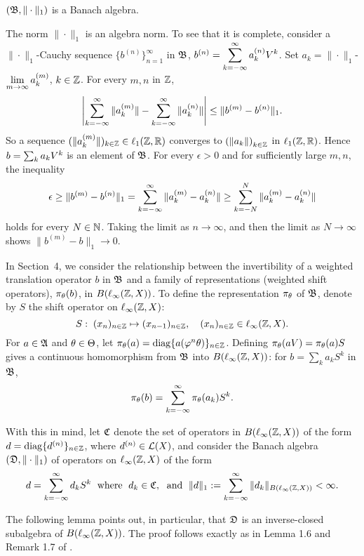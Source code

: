 \begin{prop}
$({\frak{B}},\|\cdot\|_1)$ is a Banach algebra.
\end{prop}
\begin{pf}
The norm $\|\cdot\|_1$ is an algebra norm.
To see that it is
complete, consider a $\|\cdot\|_1$-Cauchy sequence
$\{b^{(n)}\}_{n=1}^\infty$ in ${\frak{B}}$, $b^{(n)} =
\displaystyle\sum_{k=-\infty}^\infty a^{(n)}_k V^k$.  Set $a_k =
\|\cdot\|_1$-$\displaystyle\lim\sb{m\to \infty} a^{(m)}_k$,
$k\in{\Bbb{Z}}$.  For every $m,n$ in ${\Bbb{Z}}$,
$$
\left|\sum_{k=-\infty}^\infty\|a_k^{(m)}\|-\sum_{k=-\infty}^\infty\|a^{(n)}_k\|\right| \le
\|b^{(m)}-b^{(n)}\|_1.
$$
So a sequence $(\|a^{(m)}_k\|)_{k\in{\Bbb{Z}}} \in \ell_1({\Bbb{Z}},{\Bbb{R}})$
converges to $\left(\|a_k\|\right)_{k\in{\Bbb{Z}}}$ in $\ell_1({\Bbb{Z}},{\Bbb{R}})$.
Hence $b=\sum\sb{k} a_kV^k$ is an element of ${\frak{B}}$.
For every $\epsilon > 0$ and for sufficiently large $m,n$, the
inequality
$$
\epsilon \ge \|b^{(m)}-b^{(n)}\|_1 = \sum_{k=-\infty}^\infty
\|a^{(m)}_k-a^{(n)}_k \| \ge \sum^N_{k=-N} \|a^{(m)}_k-a^{(n)}_k\|
$$
holds for every $N\in {\Bbb{N}}$.
Taking the limit as $n\to\infty$, and then the limit as
$N\to\infty$ shows $\|b^{(m)}-b\|_1\to 0$.
\end{pf}

In  Section~4, we consider the relationship
between the invertibility of a weighted translation
operator $b$ in $\frak B$ and a family of representations
(weighted shift operators), $\pi_\theta (b)$, in $B(\ell_\infty({\Bbb{Z}},X))$.
To define the representation $\pi_\theta$ of ${\frak{B}}$,
denote by $S$ the shift operator on $\ell_\infty({\Bbb{Z}},X)$:
\[ S:\; (x_n)_{n\in{\Bbb{Z}}}\mapsto (x_{n-1})_{n\in{\Bbb{Z}}},
\quad (x_n)_{n\in{\Bbb{Z}}}\in \ell_\infty({\Bbb{Z}},X).\]
For $a\in{\frak{A}}$ and $\theta\in \Theta$, let
$\pi_\theta(a)=\operatorname{diag}\{a(\varphi^n\theta)\}_{n\in{\Bbb{Z}}}$.
Defining $\pi_\theta(aV)=\pi_\theta(a)S$ gives a continuous
homomorphism from ${\frak{B}}$ into $B(\ell_\infty({\Bbb{Z}},X))$:
for $b=\sum_k a_kS^k$ in ${\frak{B}}$,
\begin{equation}\lb{pisubx}
\pi_\th(b)=\sumk \pi_\th(a_k)S^k.
\end{equation}

With this in mind, let $\frak C$ denote
the set of operators in
$B(\ell_\infty({\Bbb{Z}},X))$ of the form
$d=\operatorname{diag}\{d^{(n)}\}_{n\in{\Bbb{Z}}}$, where
$d^{(n)}\in {\cal{L}}(X)$, and consider the Banach algebra
$(\frak D,\|\cdot\|_1)$ of operators on $\ell_\infty({\Bbb{Z}},X)$ of
the form
\[d=\sum_{k=-\infty}^\infty d_k S^k\;
\text{ where } \; d_k\in{\frak{C}},\;\text{ and }\;
\|d\|_1 := \sum_{k=-\infty}^\infty\|d_k\|_{B(\ell_\infty({\Bbb{Z}},X))} < \infty.\]

The following lemma points out, in particular, that ${\frak{D}}$
is an inverse-closed subalgebra of $B(\ell_\infty({\Bbb{Z}},X))$. The proof
follows exactly as in Lemma 1.6 and Remark 1.7 of \cite{LatRand}.

